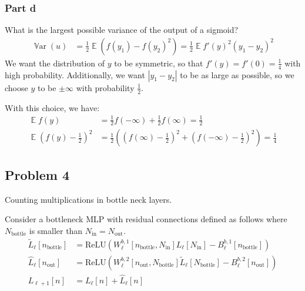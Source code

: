 \documentclass{amsart}
\DeclareMathOperator{\Var}{\mathbb{V}ar}  %
\DeclareMathOperator{\ee}{\mathbb{E}}
\theoremstyle{definition}
\begin{document}
\subsubsection*{Part d} What is the largest possible variance of the output of a sigmoid? 
\begin{align*}
  \Var(u) &= \frac{1}{2}\ee{(f(y_1) - f(y_2)^2)} = \frac12 \ee{f'(y)^2(y_1 - y_2)^2}
\end{align*}
We want the distribution of $y$ to be symmetric, so that $f'(y) = f'(0) = \frac14$ with high probability. 
Additionally, we want $|y_1 - y_2|$ to be as large as possible, so we choose $y$ to be $\pm \infty$ with probability $\frac12$.

With this choice, we have:
\begin{align*}
  \ee{f(y)} &= \frac12 f(-\infty) + \frac12 f(\infty) = \frac12\\
  \ee{(f(y) - \frac12)^2} &= \frac12 \left(
    (f(\infty) - \frac12)^2 + (f(-\infty) - \frac12)^2
  \right) = \frac14
\end{align*}

\subsection*{Problem 4} Counting multiplications in bottle neck layers. 

Consider a bottleneck MLP with residual connections defined as follows where $N_{\text{bottle}}$ is smaller than $N_{\text{in}} = N_{\text{out}}$.
\begin{align*}
  \tilde{L}_\ell[n_{\text{bottle}}] &= \mathrm{ReLU}(W_\ell^{b, 1}[n_{\text{bottle}}, N_{\text{in}}] L_{\ell}[N_{\text{in}}] - B_\ell^{b, 1}[n_{\text{bottle}}]) \\
  \hat{L}_\ell[n_{\text{out}}] &= \mathrm{ReLU}(W_\ell^{b, 2}[n_{\text{out}}, N_{\text{bottle}}] \tilde{L}_\ell[N_{\text{bottle}}] - B_\ell^{b, 2}[n_{\text{out}}]) \\
  L_{\ell + 1}[n] &= L_\ell[n] + \hat{L}_\ell[n]
\end{align*}
\end{document}
